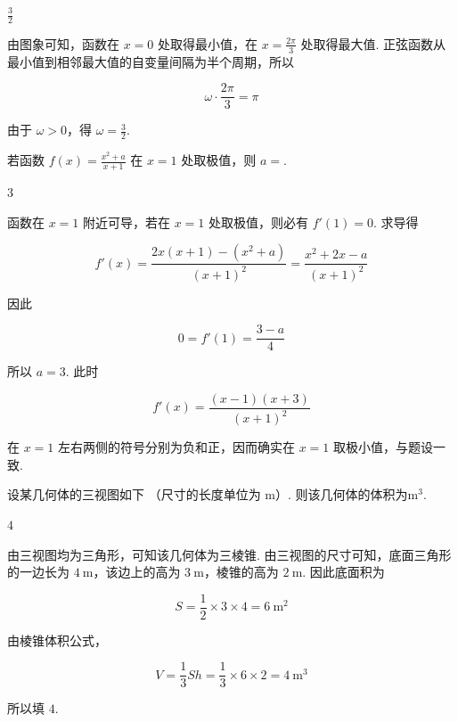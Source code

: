 \begin{answer}
    \(\frac{3}{2}\)
\end{answer}

\begin{solution}
由图象可知，函数在 \(x=0\) 处取得最小值，在 \(x=\frac{2\pi}{3}\) 处取得最大值. 正弦函数从最小值到相邻最大值的自变量间隔为半个周期，所以

\[
\omega\cdot\frac{2\pi}{3}=\pi
\]

由于 \(\omega>0\)，得 \(\omega=\frac32\).
\end{solution}

\begin{problem}
若函数 \( f(x) = \frac{x^2 + a}{x + 1} \) 在 \( x = 1 \) 处取极值，则 \( a = \)\fillinblank{}.
\end{problem}

\begin{answer}
    \(3\)
\end{answer}

\begin{solution}
函数在 \(x=1\) 附近可导，若在 \(x=1\) 处取极值，则必有 \(f'(1)=0\). 求导得

\[
f'(x)=\frac{2x(x+1)-(x^2+a)}{(x+1)^2}
 =\frac{x^2+2x-a}{(x+1)^2}
\]

因此

\[
0=f'(1)=\frac{3-a}{4}
\]

所以 \(a=3\).
此时

\[
f'(x)=\frac{(x-1)(x+3)}{(x+1)^2}
\]

在 \(x=1\) 左右两侧的符号分别为负和正，因而确实在 \(x=1\) 取极小值，与题设一致.
\end{solution}

\begin{problem}
设某几何体的三视图如下 （尺寸的长度单位为 \(\mathrm{m}\)）. 则该几何体的体积为\fillinblank{}\(\mathrm{m}^{3}\).

\end{problem}

\begin{answer}
    \(4\)
\end{answer}

\begin{solution}
由三视图均为三角形，可知该几何体为三棱锥. 由三视图的尺寸可知，底面三角形的一边长为 \(4\mathrm{~m}\)，该边上的高为 \(3\mathrm{~m}\)，棱锥的高为 \(2\mathrm{~m}\). 因此底面积为

\[
S=\frac12\times3\times4=6\mathrm{~m}^{2}
\]

由棱锥体积公式，

\[
V=\frac13Sh=\frac13\times6\times2=4\mathrm{~m}^{3}
\]

所以填 \(4\).
\end{solution}

